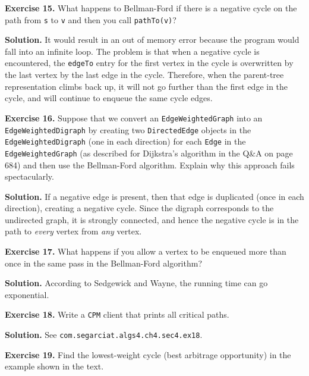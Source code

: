 \documentclass[12pt, a4paper]{article}
\newenvironment{ex}[2][Exercise]
{\par\medskip\noindent \textbf{#1 #2.}}
{\medskip}
\newenvironment{sol}[1][Solution]
{\par\medskip\noindent \textbf{#1.} }
{\medskip}
\begin{document}
	\begin{ex}{15}
		What happens to Bellman-Ford if there is a negative cycle on the path from
		\texttt{s} to \texttt{v} and then you call \texttt{pathTo(v)}?
	\end{ex}
	\begin{sol}
		It would result in an out of memory error because the program would fall into
		an infinite loop. The problem is that when a negative cycle is encountered,
		the \texttt{edgeTo} entry for the first vertex in the cycle is overwritten
		by the last vertex by the last edge in the cycle. Therefore, when the
		parent-tree representation climbs back up, it will not go further than
		the first edge in the cycle, and will continue to enqueue the same cycle
		edges.
	\end{sol}
	\begin{ex}{16}
		Suppose that we convert an \texttt{EdgeWeightedGraph} into an \texttt{EdgeWeightedDigraph}
		by creating two \texttt{DirectedEdge} objects in the \texttt{EdgeWeightedDigraph}
		(one in each direction) for each \texttt{Edge} in the \texttt{EdgeWeightedGraph}
		(as described for Dijkstra's algorithm in the Q\&A on page 684) and then use the
		Bellman-Ford algorithm. Explain why this approach fails spectacularly.
	\end{ex}
	\begin{sol}
		If a negative edge is present, then that edge is duplicated (once in each direction),
		creating a negative cycle. Since the digraph corresponds to the undirected
		graph, it is strongly connected, and hence the negative cycle is in the path
		to \emph{every} vertex from \emph{any} vertex.
	\end{sol}
	\begin{ex}{17}
		What happens if you allow a vertex to be enqueued more than once in the same pass
		in the Bellman-Ford algorithm?
	\end{ex}
	\begin{sol}
		According to Sedgewick and Wayne, the running time can go exponential.
	\end{sol}
	\begin{ex}{18}
		Write a \texttt{CPM} client that prints all critical paths.
	\end{ex}
	\begin{sol}
		See \texttt{com.segarciat.algs4.ch4.sec4.ex18}.
	\end{sol}
	\begin{ex}{19}
		Find the lowest-weight cycle (best arbitrage opportunity) in the example shown in
		the text.
	\end{ex}
\end{document}
